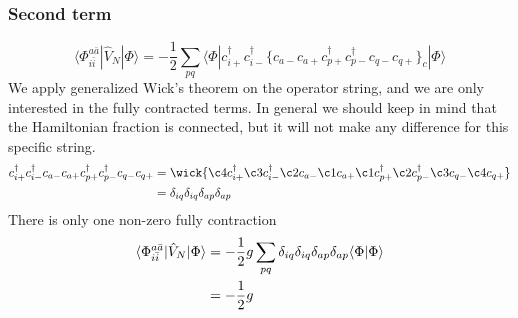 \documentclass[norsk,a4paper,12pt]{article}
\begin{document}
\subsubsection*{Second term}
\begin{equation}
\langle\Phi_{i\bar{i}}^{a\bar{a}}|\hat{V}_N|\Phi\rangle=-\frac{1}{2}\sum_{pq}\langle\Phi|c_{i+}^{\dagger}c_{i-}^{\dagger}\{c_{a-}c_{a+}c_{p+}^{\dagger}c_{p-}^{\dagger}c_{q-}c_{q+}\}_c|\Phi\rangle
\end{equation}
We apply generalized Wick's theorem on the operator string, and we are only interested in the fully contracted terms. In general we should keep in mind that the Hamiltonian fraction is connected, but it will not make any difference for this specific string.
\begin{align}
c_{i+}^{\dagger}c_{i-}^{\dagger}c_{a-}c_{a+}c_{p+}^{\dagger}c_{p-}^{\dagger}c_{q-}c_{q+}&=\wick{\c4 c_{i+}^{\dagger}\c3 c_{i-}^{\dagger}\c2 c_{a-}\c1 c_{a+}\c1 c_{p+}^{\dagger}\c2 c_{p-}^{\dagger}\c3 c_{q-}\c4 c_{q+}}\notag\\
&=\delta_{iq}\delta_{iq}\delta_{ap}\delta_{ap}
\end{align}
There is only one non-zero fully contraction
\begin{align}
\langle\Phi_{i\bar{i}}^{a\bar{a}}|\hat{V}_N|\Phi\rangle&=-\frac{1}{2}g\sum_{pq}\delta_{iq}\delta_{iq}\delta_{ap}\delta_{ap}\langle\Phi|\Phi\rangle\notag\\
&=-\frac{1}{2}g
\end{align}
\end{document}
